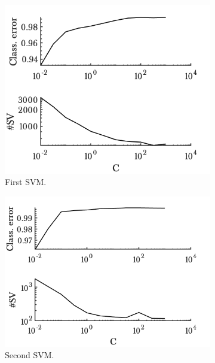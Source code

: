 \begin{figure}[ht!]
        \begin{subfigure}[b]{.47\textwidth}  
            \centering 
            \includegraphics[width=.98\textwidth]{parts/chap-4/img-svm/non-lin/svm1.png}
            \caption{First SVM.} 
        \end{subfigure}
        \hfill
        \begin{subfigure}[b]{.47\textwidth}   
            \centering 
            \includegraphics[width=.98\textwidth]{parts/chap-4/img-svm/non-lin/svm2.png}
            \caption{Second SVM.} 
        \end{subfigure}
        \hfill
        \begin{subfigure}[b]{.47\textwidth}   

\end{subfigure}
\end{figure}
